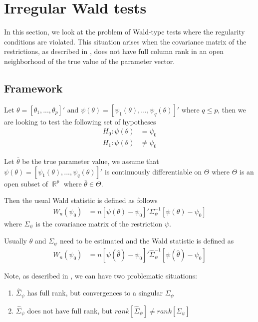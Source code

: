 \documentclass[11pt]{article}\usepackage[]{graphicx}\usepackage[]{color}
\DeclareMathOperator{\R}{\mathbb{R}}
\begin{document}
\section{Irregular Wald tests}

In this section, we look at the problem of Wald-type tests where the regularity conditions are violated. This situation arises when the covariance matrix of the restrictions, as described in \cite{dufour_wald_2013,dufour_rank-robust_2016}, does not have full column rank in an open neighborhood of the true value of the parameter vector.

\subsection{Framework}

Let $\theta = [\theta_1,...,\theta_p]'$ and $\psi(\theta)= [\psi_1(\theta),...,\psi_q(\theta)]'$ where $q \leq p$, then we are looking to test the following set of hypotheses
\begin{align}
	H_0: \psi (\theta) & = \psi_0 \\
	H_1: \psi (\theta) & \neq \psi_0
\end{align}

Let $\bar{\theta}$ be the true parameter value, we assume that $\psi(\theta)= [\psi_1(\theta),...,\psi_q(\theta)]'$ is continuously differentiable on $\Theta$ where $\Theta$ is an open subset of $\R^p$ where $\bar{\theta}\in \Theta$.

Then the usual Wald statistic is defined as follows
\begin{align}
	W_n(\psi_0) & = n \left[\psi (\theta) - \psi_0\right]' \Sigma_\psi^{-1} \left[\psi (\theta) - \psi_0\right]
\end{align}
where $\Sigma_\psi$ is the covariance matrix of the restriction $\psi$.

Usually $\theta$ and $\Sigma_\psi$ need to be estimated and the Wald statistic is defined as
\begin{align}
	W_n(\psi_0) & = n \left[\psi (\hat{\theta}) - \psi_0\right]' \hat{\Sigma}_\psi^{-1} \left[\psi (\hat{\theta}) - \psi_0\right]
\end{align}

Note, as described in \cite{dufour_wald_2013,dufour_rank-robust_2016}, we can have two problematic situations:
\begin{enumerate}
	\item $\hat{\Sigma}_\psi$ has full rank, but convergences to a singular  $\Sigma_\psi$
	\item $\hat{\Sigma}_\psi$ does not have full rank, but $rank[\hat{\Sigma}_\psi] \neq rank[\Sigma_\psi]$
\end{enumerate}
\end{document}
